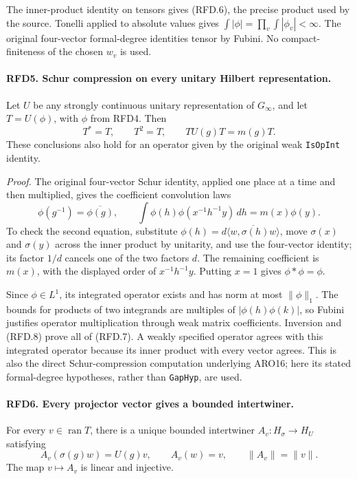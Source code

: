 \documentclass[11pt,a4paper]{article}
\numberwithin{equation}{section}
\theoremstyle{remark}\newtheorem{remark}[theorem]{Remark}
\begin{document}
The inner-product identity on tensors gives (RFD.6), the precise
product used by the source.  Tonelli applied to absolute values
gives
\(\int|\phi|=\prod_v\int|\phi_v|<\infty\).
The original four-vector formal-degree identities tensor by
Fubini.  No compact-finiteness of the chosen \(w_v\) is used.

\paragraph{RFD5. Schur compression on every unitary Hilbert representation.}
\label{claim:RFD5}
Let \(U\) be any strongly continuous unitary representation of
\(G_\infty\), and let \(T=U(\phi)\), with \(\phi\) from RFD4.
Then
\[
 T^*=T,\qquad T^2=T,\qquad T U(g)T=m(g)T.
 \tag{RFD.7}
\]
These conclusions also hold for an operator given by the original
weak \texttt{Is\allowbreak Op\allowbreak Int} identity.

\emph{Proof.}
The original four-vector Schur identity, applied one place at a
time and then multiplied, gives the coefficient convolution laws
\[
 \phi(g^{-1})=\overline{\phi(g)},\qquad
 \int\phi(h)\phi(x^{-1}h^{-1}y)\,dh=m(x)\phi(y).
 \tag{RFD.8}
\]
To check the second equation, substitute
\(\phi(h)=d\overline{\langle w,\sigma(h)w\rangle}\), move
\(\sigma(x)\) and \(\sigma(y)\) across the inner product by
unitarity, and use the four-vector identity; its factor \(1/d\)
cancels one of the two factors \(d\).  The remaining coefficient
is \(m(x)\), with the displayed order of \(x^{-1}h^{-1}y\).
Putting \(x=1\) gives \(\phi*\phi=\phi\).

Since \(\phi\in L^1\), its integrated operator exists and has
norm at most \(\|\phi\|_1\).  The bounds for products of two
integrands are multiples of \(|\phi(h)\phi(k)|\), so Fubini
justifies operator multiplication through weak matrix coefficients.
Inversion and (RFD.8) prove all of (RFD.7).  A weakly specified
operator agrees with this integrated operator because its inner
product with every vector agrees.  This is also the direct
Schur-compression computation underlying ARO16; here its stated
formal-degree hypotheses, rather than \texttt{Gap\allowbreak Hyp}, are used.

\paragraph{RFD6. Every projector vector gives a bounded intertwiner.}
\label{claim:RFD6}
For every \(v\in\operatorname{ran}T\), there is a unique bounded
intertwiner \(A_v:H_\sigma\to H_U\) satisfying
\[
 A_v(\sigma(g)w)=U(g)v,
 \qquad A_v(w)=v,
 \qquad \|A_v\|=\|v\|.
 \tag{RFD.9}
\]
The map \(v\mapsto A_v\) is linear and injective.
\end{document}
